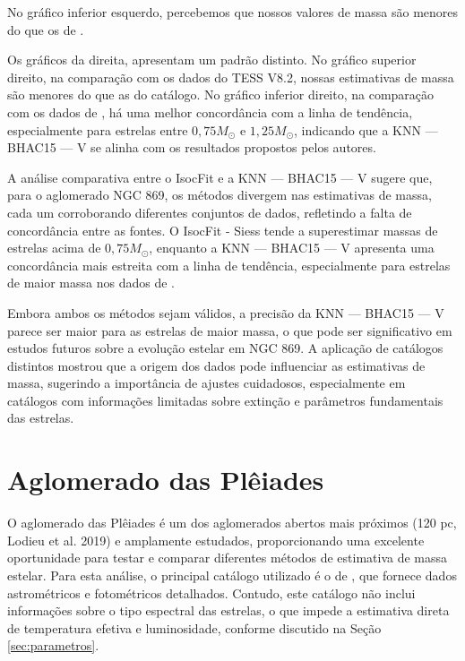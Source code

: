 	No gráfico inferior esquerdo, percebemos que nossos valores de massa são menores do que os de .
	
	Os gráficos da direita, apresentam um padrão distinto. No gráfico superior direito, na comparação com os dados do TESS V8.2, nossas estimativas de massa são menores do que as do catálogo. No gráfico inferior direito, na comparação com os dados de , há uma melhor concordância com a linha de tendência, especialmente para estrelas entre \(0,75 M_\odot\) e \(1,25 M_\odot\), indicando que a KNN — BHAC15 — V se alinha com os resultados propostos pelos autores.
	
	
	
	A análise comparativa entre o IsocFit e a KNN — BHAC15 — V sugere que, para o aglomerado NGC 869, os métodos divergem nas estimativas de massa, cada um corroborando diferentes conjuntos de dados, refletindo a falta de concordância entre as fontes. O IsocFit - Siess tende a superestimar massas de estrelas acima de \(0,75 M_\odot\), enquanto a KNN — BHAC15 — V apresenta uma concordância mais estreita com a linha de tendência, especialmente para estrelas de maior massa nos dados de .
	
	Embora ambos os métodos sejam válidos, a precisão da KNN — BHAC15 — V parece ser maior para as estrelas de maior massa, o que pode ser significativo em estudos futuros sobre a evolução estelar em NGC 869. A aplicação de catálogos distintos mostrou que a origem dos dados pode influenciar as estimativas de massa, sugerindo a importância de ajustes cuidadosos, especialmente em catálogos com informações limitadas sobre extinção e parâmetros fundamentais das estrelas.

	\section{Aglomerado das Plêiades}\label{sec:ple}
	
	O aglomerado das Plêiades é um dos aglomerados abertos mais próximos (120 pc, Lodieu et al. 2019) e amplamente estudados, proporcionando uma excelente oportunidade para testar e comparar diferentes métodos de estimativa de massa estelar. Para esta análise, o principal catálogo utilizado é o de , que fornece dados astrométricos e fotométricos detalhados. Contudo, este catálogo não inclui informações sobre o tipo espectral das estrelas, o que impede a estimativa direta de temperatura efetiva e luminosidade, conforme discutido na Seção \ref{sec:parametros}.
	
